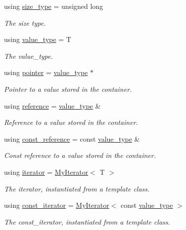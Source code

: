 \begin{DoxyCompactItemize}
\item 
using \hyperlink{classsc_1_1vector_a48bf37ba1a6d0c13504414d86e27c399}{size\+\_\+type} = unsigned long
\begin{DoxyCompactList}\small\item\em The size type. \end{DoxyCompactList}\item 
using \hyperlink{classsc_1_1vector_ad37f5bfa688e43c420ed565e4bff6fac}{value\+\_\+type} = T
\begin{DoxyCompactList}\small\item\em The value\+\_\+type. \end{DoxyCompactList}\item 
using \hyperlink{classsc_1_1vector_a0348a6e1e249e051964a2bc94b05527a}{pointer} = \hyperlink{classsc_1_1vector_ad37f5bfa688e43c420ed565e4bff6fac}{value\+\_\+type} $\ast$
\begin{DoxyCompactList}\small\item\em Pointer to a value stored in the container. \end{DoxyCompactList}\item 
using \hyperlink{classsc_1_1vector_a37394c8a6b82c4a0709737d7982e32b2}{reference} = \hyperlink{classsc_1_1vector_ad37f5bfa688e43c420ed565e4bff6fac}{value\+\_\+type} \&
\begin{DoxyCompactList}\small\item\em Reference to a value stored in the container. \end{DoxyCompactList}\item 
using \hyperlink{classsc_1_1vector_a8da2b1a11b069241100f9b2e14f481a0}{const\+\_\+reference} = const \hyperlink{classsc_1_1vector_ad37f5bfa688e43c420ed565e4bff6fac}{value\+\_\+type} \&
\begin{DoxyCompactList}\small\item\em Const reference to a value stored in the container. \end{DoxyCompactList}\item 
using \hyperlink{classsc_1_1vector_a9e5d5cc35e379aa27a93989f4a71413c}{iterator} = \hyperlink{classsc_1_1MyIterator}{My\+Iterator}$<$ T $>$
\begin{DoxyCompactList}\small\item\em The iterator, instantiated from a template class. \end{DoxyCompactList}\item 
using \hyperlink{classsc_1_1vector_a1e50aa429ea9de6ead4bfdb8614c1c9a}{const\+\_\+iterator} = \hyperlink{classsc_1_1MyIterator}{My\+Iterator}$<$ const \hyperlink{classsc_1_1vector_ad37f5bfa688e43c420ed565e4bff6fac}{value\+\_\+type} $>$
\begin{DoxyCompactList}\small\item\em The const\+\_\+iterator, instantiated from a template class. \end{DoxyCompactList}\end{DoxyCompactItemize}
